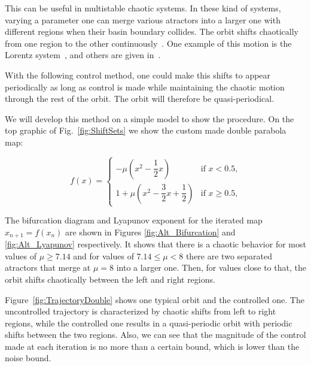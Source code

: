 This can be useful in multistable chaotic systems. In these kind of systems, varying a parameter one can merge various atractors into a larger one with different regions when their basin boundary collides. The orbit shifts chaotically from one region to the other continuously~\cite{Multistable2}. One example of this motion is the Lorentz system~\cite{Lorentz}, and others are given in~\cite{Multistable2, Multistable3, Multistable4}.

With the following control method, one could make this shifts to appear periodically as long as control is made while maintaining the chaotic motion through the rest of the orbit. The orbit will therefore be quasi-periodical.

We will develop this method on a simple model to show the procedure. On the top graphic of Fig.~\ref{fig:ShiftSets} we show the custom made double parabola map:

\begin{equation}
f(x) = \left\{ \begin{array}{ll}
-\mu (x^2 - \dfrac{1}{2}x)  & \mbox{if $x<0.5$,} \\
1 + \mu (x^2 -\dfrac{3}{2}x + \dfrac{1}{2})  & \mbox{if $x\geq 0.5$,} 
\end{array}
\right.
\end{equation}


The bifurcation diagram and Lyapunov exponent for the iterated map $x_{n+1} = f(x_n)$ are shown in Figures \ref{fig:Alt_Bifurcation} and \ref{fig:Alt_Lyapunov} respectively. It shows that there is a chaotic behavior for most values of $\mu \geq 7.14$ and for values of $ 7.14 \leq \mu < 8$ there are two separated atractors that merge at $\mu = 8$ into a larger one. Then, for values close to that, the orbit shifts chaotically between the left and right regions. 

Figure~\ref{fig:TrajectoryDouble} shows one typical orbit and the controlled one. The uncontrolled trajectory is characterized by chaotic shifts from left to right regions, while the controlled one results in a quasi-periodic orbit with periodic shifts between the two regions. Also, we can see that the magnitude of the control made at each iteration is no more than a certain bound, which is lower than the noise bound.



